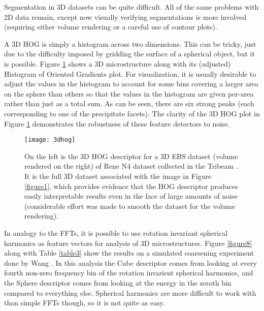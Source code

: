 \documentclass[review]{elsarticle}
\begin{document}
	Segmentation in 3D datasets can be quite difficult. All of the same problems with 2D data remain, except now visually verifying segmentations is more involved (requiring either volume rendering or a careful use of contour plots).

	A 3D HOG is simply a histogram across two dimensions. This can be tricky, just due to the difficulty imposed by gridding the surface of a spherical object, but it is possible. Figure \ref{figure4} shows a 3D microstructure along with its (adjusted) Histogram of Oriented Gradients plot. For visualization, it is usually desirable to adjust the values in the histogram to account for some bins covering a larger area on the sphere than others so that the values in the histogram are given per-area rather than just as a total sum. As can be seen, there are six strong peaks (each corresponding to one of the precipitate facets). The clarity of the 3D HOG plot in Figure \ref{figure4} demonstrates the robustness of these feature detectors to noise.
	
	\begin{figure}[!ht]
  		\centering
    	\texttt{[image: 3dhog]}
  		\caption{ On the left is the 3D HOG descriptor for a 3D EBS dataset (volume rendered on the right) of Rene N4 dataset collected in the Tribeam \cite{tribeam}. It is the full 3D dataset associated with the image in Figure \ref{figure1}, which provides evidence that the HOG descriptor produces easily interpretable results even in the face of large amounts of noise (considerable effort was made to smooth the dataset for the volume rendering). }
  		\label{figure4}
	\end{figure}

	In analogy to the FFTs, it is possible to use rotation invariant spherical harmonics \cite{spherical} as feature vectors for analysis of 3D microstructures. Figure \ref{figure8} along with Table \ref{table3} show the results on a simulated coarsening experiment done by Wang \cite{ywang2}. In this analysis the Cube descriptor comes from looking at every fourth non-zero frequency bin of the rotation invarient spherical harmonics, and the Sphere descriptor comes from looking at the energy in the zeroth bin compared to everything else. Spherical harmonics are more difficult to work with than simple FFTs though, so it is not quite as easy.
	
\end{document}

